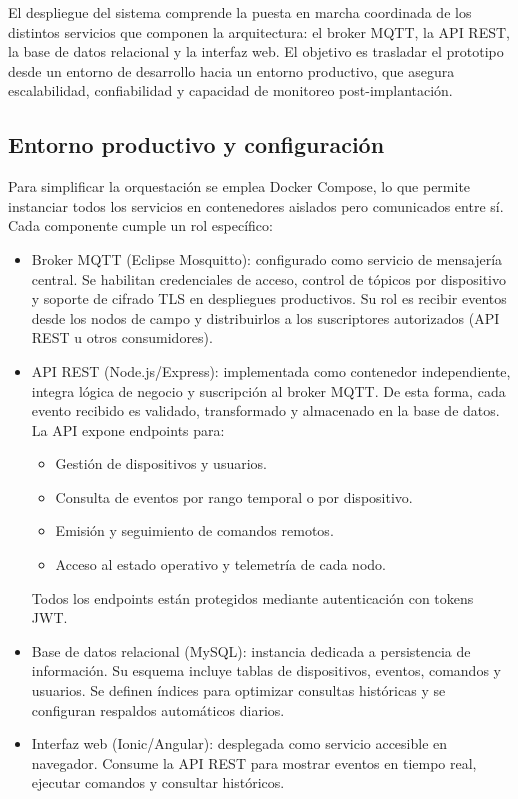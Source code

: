 El despliegue del sistema comprende la puesta en marcha coordinada de los distintos servicios que componen la arquitectura: el broker MQTT, la API REST, la base de datos relacional y la interfaz web.  
El objetivo es trasladar el prototipo desde un entorno de desarrollo hacia un entorno productivo, que asegura escalabilidad, confiabilidad y capacidad de monitoreo post-implantación.  

\subsection{Entorno productivo y configuración}

Para simplificar la orquestación se emplea Docker Compose, lo que permite instanciar todos los servicios en contenedores aislados pero comunicados entre sí.  
Cada componente cumple un rol específico:  

\begin{itemize}
    \item Broker MQTT (Eclipse Mosquitto): configurado como servicio de mensajería central. Se habilitan credenciales de acceso, control de tópicos por dispositivo y soporte de cifrado TLS en despliegues productivos. Su rol es recibir eventos desde los nodos de campo y distribuirlos a los suscriptores autorizados (API REST u otros consumidores).
    
    \item API REST (Node.js/Express): implementada como contenedor independiente, integra lógica de negocio y suscripción al broker MQTT. De esta forma, cada evento recibido es validado, transformado y almacenado en la base de datos. La API expone endpoints para:
    \begin{itemize}
        \item Gestión de dispositivos y usuarios.
        \item Consulta de eventos por rango temporal o por dispositivo.
        \item Emisión y seguimiento de comandos remotos.
        \item Acceso al estado operativo y telemetría de cada nodo.
    \end{itemize}
    Todos los endpoints están protegidos mediante autenticación con tokens JWT.
    
    \item Base de datos relacional (MySQL): instancia dedicada a persistencia de información. Su esquema incluye tablas de dispositivos, eventos, comandos y usuarios. Se definen índices para optimizar consultas históricas y se configuran respaldos automáticos diarios.
    
    \item Interfaz web (Ionic/Angular): desplegada como servicio accesible en navegador. Consume la API REST para mostrar eventos en tiempo real, ejecutar comandos y consultar históricos.
\end{itemize}

